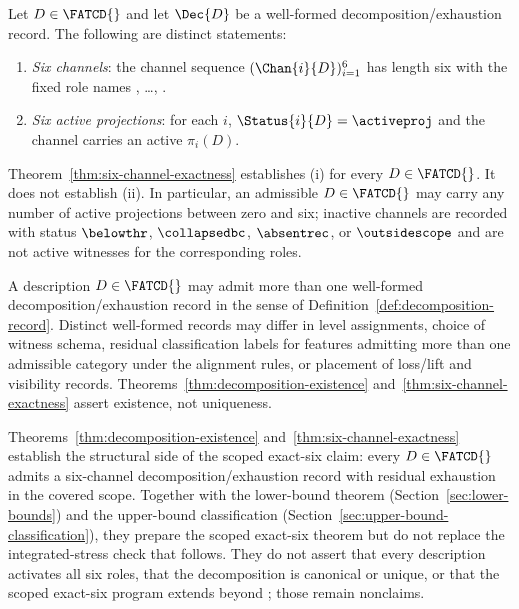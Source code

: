 \begin{proposition}\label{prop:channel-vs-activation}
Let \(D \in \FATCD{}\) and let \(\Dec{D}\) be a well-formed decomposition/exhaustion
record. The following are distinct statements:
\begin{enumerate}[label=(\roman*),topsep=2pt,itemsep=1pt]
  \item \emph{Six channels}: the channel sequence
    \((\Chan{i}{D})_{i=1}^{6}\) has length six with the fixed role names
    \Pone{}, \ldots, \Psix{}.
  \item \emph{Six active projections}: for each \(i\),
    \(\Status{i}{D} = \activeproj\) and the channel carries an active
    \(\pi_i(D)\).
\end{enumerate}
Theorem~\ref{thm:six-channel-exactness} establishes (i) for every
\(D \in \FATCD{}\). It does not establish (ii). In particular, an
admissible \(D \in \FATCD{}\) may carry any number of active projections
between zero and six; inactive channels are recorded with status
\(\belowthr\), \(\collapsedbc\), \(\absentrec\), or \(\outsidescope\)
and are not active witnesses for the corresponding roles.
\end{proposition}

\begin{proposition}\label{prop:non-uniqueness}
A description \(D \in \FATCD{}\) may admit more than one well-formed
decomposition/exhaustion record in the sense of
Definition~\ref{def:decomposition-record}. Distinct well-formed records
may differ in level assignments, choice of witness schema, residual
classification labels for features admitting more than one admissible
category under the alignment rules, or placement of loss/lift and
visibility records. Theorems~\ref{thm:decomposition-existence}
and~\ref{thm:six-channel-exactness} assert existence, not uniqueness.
\end{proposition}

\begin{remark}\label{rem:dec-scope}
Theorems~\ref{thm:decomposition-existence}
and~\ref{thm:six-channel-exactness} establish the structural side of
the scoped exact-six claim: every \(D \in \FATCD{}\) admits a
six-channel decomposition/exhaustion record with residual exhaustion
in the covered scope. Together with the lower-bound theorem
(Section~\ref{sec:lower-bounds}) and the upper-bound classification
(Section~\ref{sec:upper-bound-classification}), they prepare the
scoped exact-six theorem but do not replace the integrated-stress
check that follows. They do not assert that every description
activates all six roles, that the decomposition is canonical or
unique, or that the scoped exact-six program extends beyond \FATCD{};
those remain nonclaims.
\end{remark}

